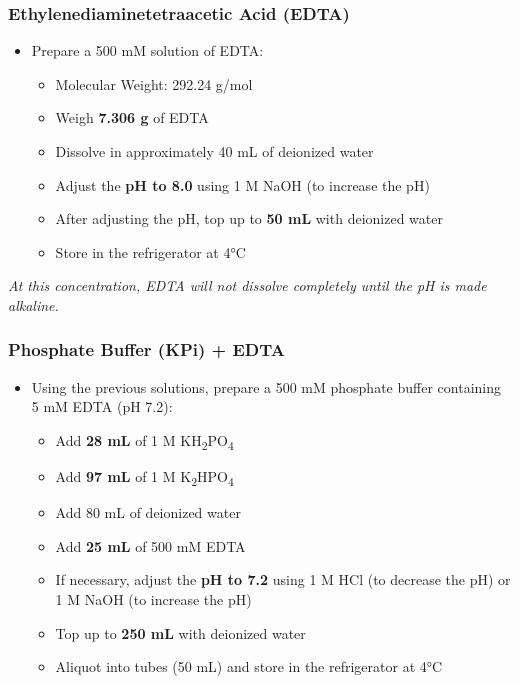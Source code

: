 \documentclass[
  9pt,
  american,
  a5paper,
  extrafontsizes,onecolumn,openright
  ]{memoir}
\providecommand{\tightlist}{%
  \setlength{\itemsep}{0pt}\setlength{\parskip}{0pt}}
\begin{document}
\subsubsection{Ethylenediaminetetraacetic Acid (EDTA)}\label{ethylenediaminetetraacetic-acid-edta}

\begin{itemize}
\tightlist
\item
  Prepare a 500 mM solution of EDTA:

  \begin{itemize}
  \tightlist
  \item
    Molecular Weight: 292.24 g/mol
  \item
    Weigh \textbf{7.306 g} of EDTA
  \item
    Dissolve in approximately 40 mL of deionized water
  \item
    Adjust the \textbf{pH to 8.0} using 1 M NaOH (to increase the pH)
  \item
    After adjusting the pH, top up to \textbf{50 mL} with deionized water
  \item
    Store in the refrigerator at 4°C
  \end{itemize}
\end{itemize}

\begin{greybox}[frametitle = Note]
\emph{At this concentration, EDTA will not dissolve completely until the pH is made alkaline.}

\end{greybox}

\subsubsection{Phosphate Buffer (KPi) + EDTA}\label{phosphate-buffer-kpi-edta-1}

\begin{itemize}
\tightlist
\item
  Using the previous solutions, prepare a 500 mM phosphate buffer containing 5 mM EDTA (pH 7.2):

  \begin{itemize}
  \tightlist
  \item
    Add \textbf{28 mL} of 1 M KH\textsubscript{2}PO\textsubscript{4}
  \item
    Add \textbf{97 mL} of 1 M K\textsubscript{2}HPO\textsubscript{4}
  \item
    Add 80 mL of deionized water
  \item
    Add \textbf{25 mL} of 500 mM EDTA
  \item
    If necessary, adjust the \textbf{pH to 7.2} using 1 M HCl (to decrease the pH) or 1 M NaOH (to increase the pH)
  \item
    Top up to \textbf{250 mL} with deionized water
  \item
    Aliquot into tubes (50 mL) and store in the refrigerator at 4°C
  \end{itemize}
\end{itemize}
\end{document}

